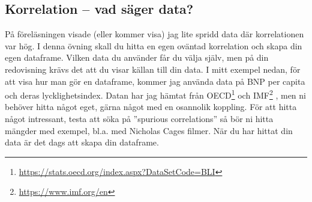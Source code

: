 \documentclass{article}
\begin{document}
\subsection{Korrelation -- vad säger data?}
På föreläsningen visade (eller kommer visa) jag lite spridd data där korrelationen var hög. I denna övning skall du hitta en egen oväntad korrelation och skapa din egen dataframe.  Vilken data du använder får du välja själv, men på din redovisning krävs det att du visar källan till din data. I mitt exempel nedan, för att visa hur man gör en dataframe, kommer jag använda data på BNP per capita och deras lycklighetsindex. Datan har jag hämtat från OECD\footnote{\url{https://stats.oecd.org/index.aspx?DataSetCode=BLI}}  och IMF\footnote{\url{https://www.imf.org/en}} , men ni behöver hitta något eget, gärna något med en osannolik koppling. För att hitta något intressant, testa att söka på ”spurious correlations” så bör ni hitta mängder med exempel, bl.a. med Nicholas Cages filmer. När du har hittat din data är det dags att skapa din dataframe.
\end{document}
